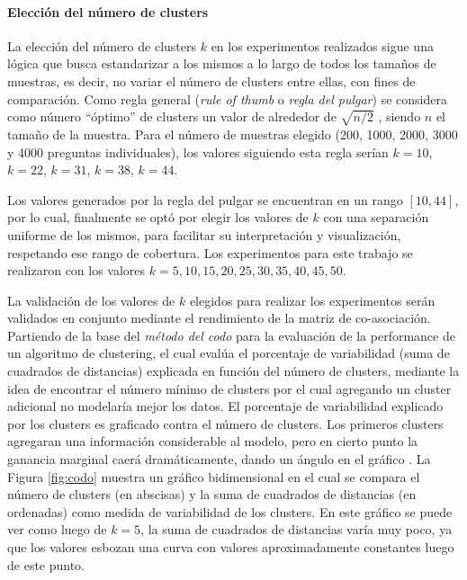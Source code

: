 \paragraph{Elección del número de clusters}
La elección del número de clusters \(k\) en los experimentos realizados sigue una lógica que busca estandarizar a los mismos a lo largo de todos los tamaños de muestras, es decir, no variar el número de clusters entre ellas, con fines de comparación. Como regla general (\textit{rule of thumb} o \textit{regla del pulgar}) se considera como número ``óptimo'' de clusters un valor de alrededor de \(\sqrt{n/2}\) \citep{kodinariya2013review}, siendo \(n\) el tamaño de la muestra. Para el número de muestras elegido (200, 1000, 2000, 3000 y 4000 preguntas individuales), los valores siguiendo esta regla serían \(k = 10\), \(k = 22\), \(k = 31\), \(k = 38\), \(k =44\).

\bigskip Los valores generados por la regla del pulgar se encuentran en un rango \([10, 44]\), por lo cual, finalmente se optó por elegir los valores de \(k\) con una separación uniforme de los mismos, para facilitar su interpretación y visualización, respetando ese rango de cobertura. Los experimentos para este trabajo se realizaron con los valores \(k = 5, 10, 15, 20, 25, 30, 35, 40, 45, 50\).

\bigskip La validación de los valores de \(k\) elegidos para realizar los experimentos serán validados en conjunto mediante el rendimiento de la matriz de co-asociación. Partiendo de la base del \textit{método del codo} para la evaluación de la performance de un algoritmo de clustering, el cual evalúa el porcentaje de variabilidad (suma de cuadrados de distancias) explicada en función del número de clusters, mediante la idea de encontrar el número mínimo de clusters por el cual agregando un cluster adicional no modelaría mejor los datos. El porcentaje de variabilidad explicado por los clusters es graficado contra el número de clusters. Los primeros clusters agregaran una información considerable al modelo, pero en cierto punto la ganancia marginal caerá dramáticamente, dando un ángulo en el gráfico \citep{bholowalia2014ebk}. La Figura \ref{fig:codo} muestra un gráfico bidimensional en el cual se compara el número de clusters (en abscisas) y la suma de cuadrados de distancias (en ordenadas) como medida de variabilidad de los clusters. En este gráfico se puede ver como luego de \(k = 5\), la suma de cuadrados de distancias varía muy poco, ya que los valores esbozan una curva con valores aproximadamente constantes luego de este punto.

